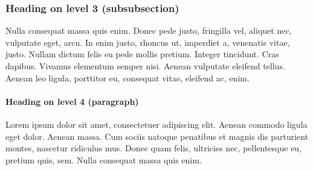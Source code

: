 \documentclass[12pt, a4paper, titlepage, hidelinks]{scrreprt}
\begin{document}
\subsubsection{Heading on level 3 (subsubsection)}
Nulla consequat massa quis enim. Donec pede justo, fringilla vel, aliquet nec, vulputate eget, arcu. In enim justo, rhoncus ut, imperdiet a, venenatis vitae, justo. Nullam dictum felis eu pede mollis pretium. Integer tincidunt. Cras dapibus. Vivamus elementum semper nisi. Aenean vulputate eleifend tellus. Aenean leo ligula, porttitor eu, consequat vitae, eleifend ac, enim.

\paragraph{Heading on level 4 (paragraph)}
Lorem ipsum dolor sit amet, consectetuer adipiscing elit. Aenean commodo ligula eget dolor. Aenean massa. Cum sociis natoque penatibus et magnis dis parturient montes, nascetur ridiculus mus. Donec quam felis, ultricies nec, pellentesque eu, pretium quis, sem. Nulla consequat massa quis enim. 
\end{document}
